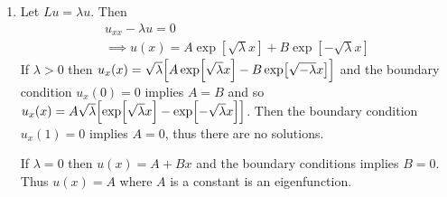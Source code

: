 \documentclass{article} %
\theoremstyle{plain}
\numberwithin{equation}{section} %
\numberwithin{figure}{section} %
\numberwithin{table}{section} %
\begin{document}
\begin{enumerate}[\ \ (a)]
    \item
        Let $Lu = \lambda u$.  Then
        \begin{align*}
            u_{xx} - \lambda u = 0 \\
            \implies u(x) = A\exp[\sqrt{\lambda}x] + B\exp[-\sqrt{\lambda}x]
        \end{align*}
        If $\lambda > 0$ then $u_x(x) = \sqrt{\lambda}\qty[A\exp[\sqrt{\lambda}x] - B\exp[\sqrt{-\lambda}x]]$ and the boundary condition $u_x(0) = 0$ implies $A = B$ and so $u_x(x) = A\sqrt{\lambda}\qty[\exp[\sqrt{\lambda}x] - \exp[-\sqrt{\lambda}x]]$.  Then the boundary condition $u_x(1) = 0$ implies $A = 0$, thus there are no solutions.

        If $\lambda = 0$ then $u(x) = A + Bx$ and the boundary conditions implies $B = 0$.  Thus $u(x) = A$ where $A$ is a constant is an eigenfunction.


\end{enumerate}
\end{document}
